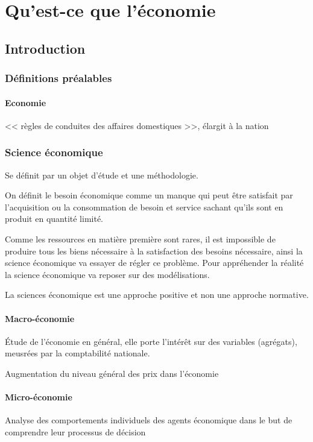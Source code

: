 	\chapter{Qu'est-ce que l'économie}
	\section{Introduction}
	\subsection{Définitions préalables}
	\subsubsection{Economie}
		<< règles de conduites des affaires domestiques >>, élargit à la nation
		\subsection{Science économique}
		Se définit par un objet d'étude et une méthodologie.

	On définit le besoin économique comme un manque qui peut être satisfait par l'acquisition ou la consommation de besoin et service sachant qu'ils
	sont en produit en quantité limité.

	Comme les ressources en matière première sont rares, il est impossible de produire tous les biens nécessaire à la satisfaction des besoins
	nécessaire, ainsi la science économique va essayer de régler ce problème. Pour appréhender la réalité la science économique va reposer sur des
	modélisations.

	La sciences économique est une approche positive et non une approche normative.

	\subsubsection{Macro-économie}
	Étude de l'économie en général, elle porte l'intérêt sur des variables (agrégats), meusrées par la comptabilité nationale. 
	\begin{exemple}
		Augmentation du niveau général des prix dans l'économie	
	\end{exemple}
	\subsubsection{Micro-économie}
	Analyse des comportements individuels des agents économique dans le but de comprendre leur processus de décision
